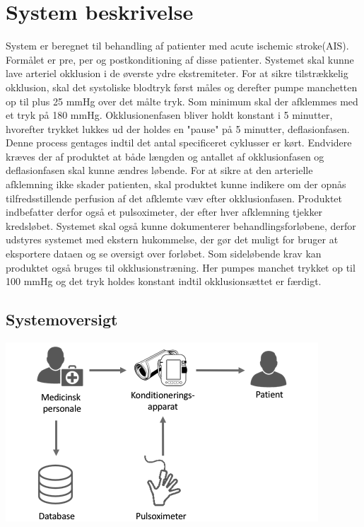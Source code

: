 \chapter{System beskrivelse}
System er beregnet til behandling af patienter med acute ischemic stroke(AIS). Formålet er pre, per og postkonditioning af disse patienter. Systemet skal kunne lave arteriel okklusion i de øverste ydre ekstremiteter. For at sikre tilstrækkelig okklusion, skal det systoliske blodtryk først måles og derefter pumpe manchetten op til plus 25 mmHg over det målte tryk. Som minimum skal der afklemmes med et tryk på 180 mmHg. Okklusionenfasen  bliver holdt konstant i 5 minutter, hvorefter trykket lukkes ud der holdes en "pause" på 5 minutter, deflasionfasen. Denne process gentages indtil det antal specificeret cyklusser er kørt. Endvidere kræves der af produktet at både længden og antallet af okklusionfasen og deflasionfasen skal kunne ændres løbende. 
For at sikre at den arterielle afklemning ikke skader patienten, skal produktet kunne indikere om der opnås tilfredsstillende perfusion af det afklemte væv efter okklusionfasen. Produktet indbefatter derfor også et pulsoximeter, der efter hver afklemning tjekker kredsløbet. Systemet skal også kunne dokumenterer behandlingsforløbene, derfor udstyres systemet med ekstern hukommelse, der gør det muligt for bruger at eksportere dataen og se oversigt over forløbet. 
Som sideløbende krav kan produktet også bruges til okklusionstræning. Her pumpes manchet trykket op til 100 mmHg og det tryk holdes konstant indtil okklusionsættet er færdigt.  

\section{Systemoversigt}
\includegraphics[width=\textwidth]{Illustrationer/saelgertegning.png}